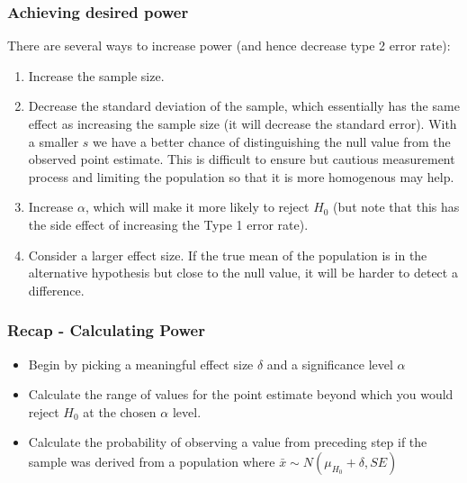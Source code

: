 \begin{frame}
\frametitle{Achieving desired power}

There are several ways to increase power (and hence decrease type 2 error rate):

\pause

\begin{enumerate}

\item Increase the sample size.

\pause

\item Decrease the standard deviation of the sample, which essentially has the same effect as increasing the sample size (it will decrease the standard error). With a smaller $s$ we have a better chance of distinguishing the null value from the observed point estimate. This is difficult to ensure but cautious measurement process and limiting the population so that it is more homogenous may help.

\pause

\item Increase $\alpha$, which will make it more likely to reject $H_0$ (but note that this has the side effect of increasing the Type 1 error rate).

\pause

\item Consider a larger effect size. If the true mean of the population is in the alternative hypothesis but close to the null value, it will be harder to detect a difference.

\end{enumerate}

\end{frame}


\begin{frame}
\frametitle{Recap - Calculating Power}

\begin{itemize}

\item Begin by picking a meaningful effect size $\delta$ and a significance level $\alpha$
\item Calculate the range of values for the point estimate beyond which you would reject $H_0$ at the chosen $\alpha$ level.
\item Calculate the probability of observing a value from preceding step if the sample was derived from a population where $\bar{x} \sim N(\mu_{H_0}+\delta,SE)$

\end{itemize}

\end{frame}


